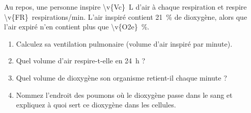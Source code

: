 Au repos, une personne inspire \qty{\v{Vc}}{L} d'air à chaque respiration et respire \qty{\v{FR}}{respirations/min}. L'air inspiré contient \qty{21}{\percent} de dioxygène, alors que l'air expiré n'en contient plus que \qty{\v{O2e}}{\percent}.

\begin{enumerate}[label=\alph*)]
    \item Calculez sa ventilation pulmonaire (volume d'air inspiré par minute).
    \item Quel volume d'air respire-t-elle en \qty{24}{h} ?
    \item Quel volume de dioxygène son organisme retient-il chaque minute ?
    \item Nommez l'endroit des poumons où le dioxygène passe dans le sang et expliquez à quoi sert ce dioxygène dans les cellules.
\end{enumerate}
